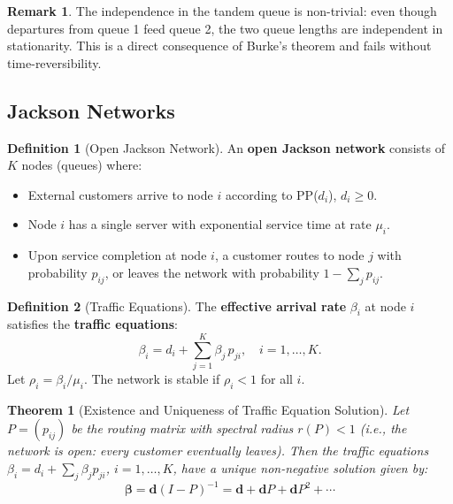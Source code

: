 \documentclass[12pt, a4paper]{article}
\theoremstyle{definition}
\newtheorem{definition}{Definition}[section]
\newtheorem{remark}{Remark}[section]
\theoremstyle{plain}
\newtheorem{theorem}{Theorem}[section]
\begin{document}
\begin{remark}
The independence in the tandem queue is non-trivial: even though departures from queue 1 feed queue 2, the two queue lengths are independent in stationarity. This is a direct consequence of Burke's theorem and fails without time-reversibility.
\end{remark}

\subsection{Jackson Networks}

\begin{definition}[Open Jackson Network]
An \textbf{open Jackson network} consists of $K$ nodes (queues) where:
\begin{itemize}
  \item External customers arrive to node $i$ according to PP($d_i$), $d_i \ge 0$.
  \item Node $i$ has a single server with exponential service time at rate $\mu_i$.
  \item Upon service completion at node $i$, a customer routes to node $j$ with probability $p_{ij}$, or leaves the network with probability $1 - \sum_j p_{ij}$.
\end{itemize}
\end{definition}

\begin{definition}[Traffic Equations]
The \textbf{effective arrival rate} $\beta_i$ at node $i$ satisfies the \textbf{traffic equations}:
\[
  \beta_i = d_i + \sum_{j=1}^{K} \beta_j\, p_{ji}, \quad i = 1, \ldots, K.
\]
Let $\rho_i = \beta_i / \mu_i$. The network is stable if $\rho_i < 1$ for all $i$.
\end{definition}

\begin{theorem}[Existence and Uniqueness of Traffic Equation Solution]
\label{thm:jackson-traffic}
Let $P = (p_{ij})$ be the routing matrix with spectral radius $r(P) < 1$ (i.e., the network is open: every customer eventually leaves). Then the traffic equations $\beta_i = d_i + \sum_j \beta_j p_{ji}$, $i = 1,\ldots,K$, have a unique non-negative solution given by:
\[
  \boldsymbol{\beta} = \mathbf{d}(I - P)^{-1} = \mathbf{d} + \mathbf{d}P + \mathbf{d}P^2 + \cdots
\]
\end{theorem}
\end{document}
